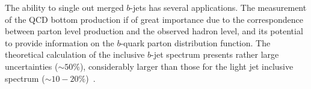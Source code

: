 
The ability to single out merged $b$-jets %
has several applications.
The measurement of the QCD bottom production if of great importance due to the correspondence between parton level production and the observed hadron level, and its potential to provide information on the $b$-quark parton distribution function. %
The theoretical calculation of the inclusive $b$-jet spectrum presents rather large uncertainties ($\sim 50\%$), considerably larger than those for the light jet inclusive spectrum ($\sim 10-20\%$)~\cite{Frixione:1996nh}. %

